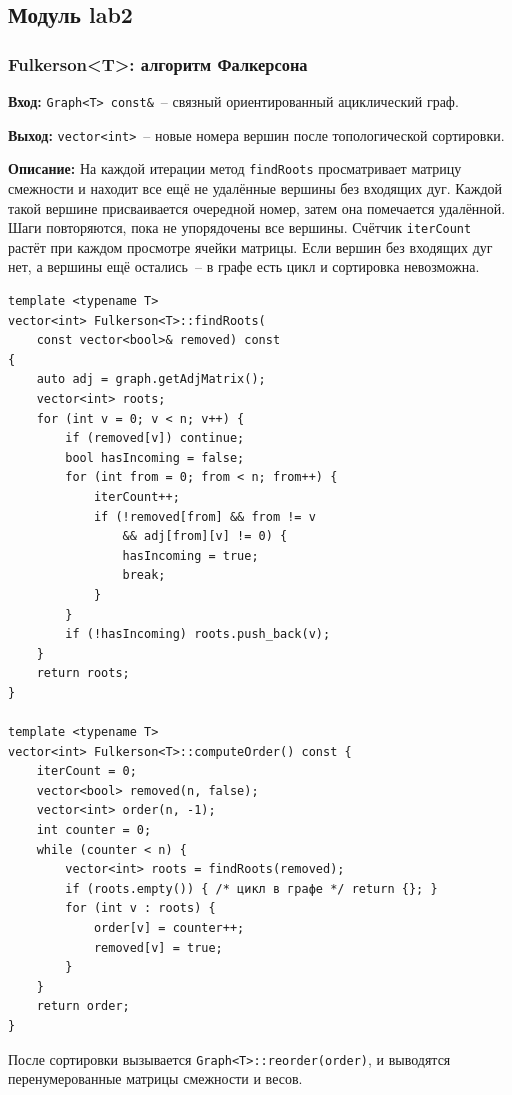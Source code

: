 \subsection{Модуль lab2}

\subsubsection{Fulkerson\textless T\textgreater: алгоритм Фалкерсона}

\textbf{Вход:} \texttt{Graph<T> const\&}~-- связный ориентированный
ациклический граф.

\textbf{Выход:} \texttt{vector<int>}~-- новые номера вершин после
топологической сортировки.

\textbf{Описание:} На каждой итерации метод \texttt{findRoots} просматривает
матрицу смежности и находит все ещё не удалённые вершины без входящих дуг.
Каждой такой вершине присваивается очередной номер, затем она помечается
удалённой. Шаги повторяются, пока не упорядочены все вершины.
Счётчик \texttt{iterCount} растёт при каждом просмотре ячейки матрицы.
Если вершин без входящих дуг нет, а вершины ещё остались~-- в графе
есть цикл и сортировка невозможна.

\begin{lstlisting}[style=cstyle, caption={Поиск корней и вычисление порядка (fulkerson.cpp)}]
template <typename T>
vector<int> Fulkerson<T>::findRoots(
    const vector<bool>& removed) const
{
    auto adj = graph.getAdjMatrix();
    vector<int> roots;
    for (int v = 0; v < n; v++) {
        if (removed[v]) continue;
        bool hasIncoming = false;
        for (int from = 0; from < n; from++) {
            iterCount++;
            if (!removed[from] && from != v
                && adj[from][v] != 0) {
                hasIncoming = true;
                break;
            }
        }
        if (!hasIncoming) roots.push_back(v);
    }
    return roots;
}

template <typename T>
vector<int> Fulkerson<T>::computeOrder() const {
    iterCount = 0;
    vector<bool> removed(n, false);
    vector<int> order(n, -1);
    int counter = 0;
    while (counter < n) {
        vector<int> roots = findRoots(removed);
        if (roots.empty()) { /* цикл в графе */ return {}; }
        for (int v : roots) {
            order[v] = counter++;
            removed[v] = true;
        }
    }
    return order;
}
\end{lstlisting}

После сортировки вызывается \texttt{Graph<T>::reorder(order)},
и выводятся перенумерованные матрицы смежности и весов.

